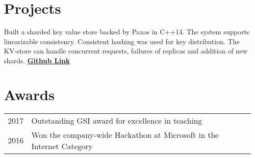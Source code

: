 \documentclass[]{resume-openfont}
\begin{document}
\begin{minipage}[t]{0.69\textwidth}

\section{Projects}
Built a sharded key value store backed by Paxos in C++14. The system supports linearizable consistency. Consistent hashing was used for key distribution. The KV-store can handle concurrent requests, failures of replicas and addition of new shards. \textbf{\href{https://github.com/pranavr93/sharded_key_value_store}{Github Link}}
\sectionsep


\section{Awards} 
\begin{tabular}{rll}
2017	     & Outstanding GSI award for excellence in teaching \\
2016	     & Won the company-wide Hackathon at Microsoft in the Internet Category \\
\end{tabular}
\sectionsep

\end{minipage} 
\end{document}
